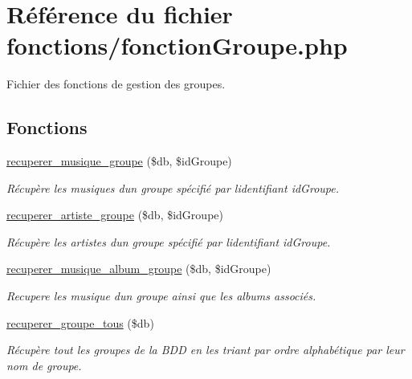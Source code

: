 \hypertarget{fonctionGroupe_8php}{}\section{Référence du fichier fonctions/fonction\+Groupe.php}
\label{fonctionGroupe_8php}


Fichier des fonctions de gestion des groupes.  


\subsection*{Fonctions}
\begin{DoxyCompactItemize}
\item 
\hyperlink{fonctionGroupe_8php_a51bb71b4c783c8ad6dd4b711e535a9cf}{recuperer\+\_\+musique\+\_\+groupe} (\$db, \$id\+Groupe)
\begin{DoxyCompactList}\small\item\em Récupère les musiques d\textquotesingle{}un groupe spécifié par l\textquotesingle{}identifiant \textquotesingle{}id\+Groupe\textquotesingle{}. \end{DoxyCompactList}\item 
\hyperlink{fonctionGroupe_8php_a34135e56ea5b1a693f2011948fda5f9d}{recuperer\+\_\+artiste\+\_\+groupe} (\$db, \$id\+Groupe)
\begin{DoxyCompactList}\small\item\em Récupère les artistes d\textquotesingle{}un groupe spécifié par l\textquotesingle{}identifiant \textquotesingle{}id\+Groupe\textquotesingle{}. \end{DoxyCompactList}\item 
\hyperlink{fonctionGroupe_8php_ac8697575153e35f57430871856fb20c0}{recuperer\+\_\+musique\+\_\+album\+\_\+groupe} (\$db, \$id\+Groupe)
\begin{DoxyCompactList}\small\item\em Recupere les musique d\textquotesingle{}un groupe ainsi que les albums associés. \end{DoxyCompactList}\item 
\hyperlink{fonctionGroupe_8php_ab838f956b9b2a941a1612ad8a681bf51}{recuperer\+\_\+groupe\+\_\+tous} (\$db)
\begin{DoxyCompactList}\small\item\em Récupère tout les groupes de la B\+DD en les triant par ordre alphabétique par leur nom de groupe. \end{DoxyCompactList}\item 

\end{DoxyCompactItemize}
